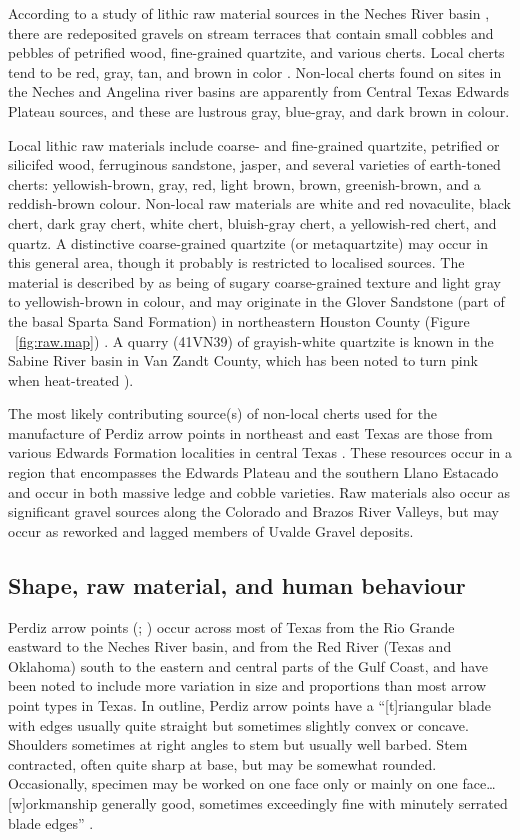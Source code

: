 \documentclass[review]{elsarticle}
\begin{document}
According to a study of lithic raw material sources in the Neches River basin \citet[69]{RN1253}, there are redeposited gravels on stream terraces that contain small cobbles and pebbles of petrified wood, fine-grained quartzite, and various cherts. Local cherts tend to be red, gray, tan, and brown in color \cite[66]{RN1253}. Non-local cherts found on sites in the Neches and Angelina river basins are apparently from Central Texas Edwards Plateau sources, and these are lustrous gray, blue-gray, and dark brown in colour.

Local lithic raw materials include coarse- and fine-grained quartzite, petrified or silicifed wood, ferruginous sandstone, jasper, and several varieties of earth-toned cherts: yellowish-brown, gray, red, light brown, brown, greenish-brown, and a reddish-brown colour. Non-local raw materials are white and red novaculite, black chert, dark gray chert, white chert, bluish-gray chert, a yellowish-red chert, and quartz. A distinctive coarse-grained quartzite (or metaquartzite) may occur in this general area, though it probably is restricted to localised sources. The material is described by \citet[67]{RN1253} as being of sugary coarse-grained texture and light gray to yellowish-brown in colour, and may originate in the Glover Sandstone (part of the basal Sparta Sand Formation) in northeastern Houston County (Figure ~\ref{fig:raw.map}) \cite[69]{RN1253}. A quarry (41VN39) of grayish-white quartzite is known in the Sabine River basin in Van Zandt County, which has been noted to turn pink when heat-treated \cite{RN1898}).

The most likely contributing source(s) of non-local cherts used for the manufacture of Perdiz arrow points in northeast and east Texas are those from various Edwards Formation localities in central Texas \citep{RN439,RN2145}. These resources occur in a region that encompasses the Edwards Plateau and the southern Llano Estacado and occur in both massive ledge and cobble varieties. Raw materials also occur as significant gravel sources along the Colorado and Brazos River Valleys, but may occur as reworked and lagged members of Uvalde Gravel deposits.

\subsection*{Shape, raw material, and human behaviour}

Perdiz arrow points (\citealp[283 and Plate 142]{RN7795}; \citealp[504 and Plate 131]{RN5769}) occur across most of Texas from the Rio Grande eastward to the Neches River basin, and from the Red River (Texas and Oklahoma) south to the eastern and central parts of the Gulf Coast, and have been noted to include more variation in size and proportions than most arrow point types in Texas. In outline, Perdiz arrow points have a “[t]riangular blade with edges usually quite straight but sometimes slightly convex or concave. Shoulders sometimes at right angles to stem but usually well barbed. Stem contracted, often quite sharp at base, but may be somewhat rounded. Occasionally, specimen may be worked on one face only or mainly on one face…[w]orkmanship generally good, sometimes exceedingly fine with minutely serrated blade edges” \cite[504]{RN5769}. 
\end{document}
